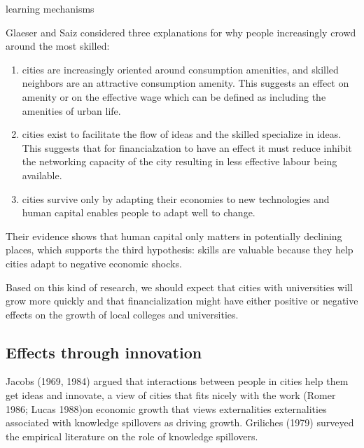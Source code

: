 learning mechanisms




Glaeser and Saiz \cite{glaeserRiseSkilledCity2003} considered three explanations for why people increasingly crowd around the most skilled:  
\begin {enumerate} 
\item cities are increasingly oriented around consumption amenities, and skilled neighbors are an attractive consumption amenity. This suggests an effect on amenity or on the effective wage which can be defined as  including the  amenities of urban life. 
\item  cities exist to facilitate the flow of ideas and the skilled specialize in ideas. This suggests that for financialzation to have an effect it must reduce inhibit the networking capacity of  the city resulting in less effective labour being available.
\item cities survive only by adapting their economies to new technologies and human capital enables people to adapt well to change. 
\end{enumerate}
Their evidence shows that human capital only matters in potentially declining places, which  supports the third hypothesis: skills are valuable because they help cities adapt  to negative economic shocks.

Based on this kind of research, we should expect that cities with universities will grow more quickly and that financialization might have either positive or negative effects on the growth of local colleges and universities. 

\subsection{Effects through innovation}



Jacobs (1969, 1984) argued that interactions between people in cities help them get ideas and innovate, a view of cities that fits nicely with the work (Romer 1986; Lucas 1988)on economic growth that views externalities  externalities associated with knowledge spillovers as driving growth. Griliches (1979) surveyed the empirical literature on the role of knowledge spillovers. 

